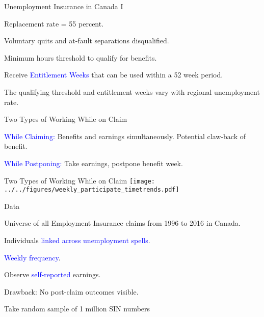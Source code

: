 \documentclass{beamer}
\newenvironment{wideenumerate}{\enumerate\addtolength{\itemsep}{16pt}}{\endenumerate}
\newenvironment{widelist}{\itemize\addtolength{\itemsep}{16pt}}{\enditemize}
\begin{document}
\begin{frame}{Unemployment Insurance in Canada I}
\begin{widelist}
	\item Replacement rate = 55 percent.
	\item Voluntary quits and at-fault separations disqualified.
	\item Minimum hours threshold to qualify for benefits.
	\item Receive \textcolor{blue}{Entitlement Weeks} that can be used within a 52 week period.
	\item The qualifying threshold and entitlement weeks vary with regional unemployment rate.
\end{widelist}
\end{frame}


\begin{frame}{Two Types of Working While on Claim}
\begin{widelist}
	\item \textcolor{blue}{While Claiming:} Benefits and earnings simultaneously. Potential claw-back of benefit.
	\item \textcolor{blue}{While Postponing:} Take earnings, postpone benefit week.
\end{widelist}
\end{frame}

\begin{frame}{Two Types of Working While on Claim}
\texttt{[image: ../../figures/weekly\_participate\_timetrends.pdf]}
\end{frame}

\begin{frame}{Data}
\begin{wideenumerate}
	\item Universe of all Employment Insurance claims from 1996 to 2016 in Canada. \\
	\item Individuals \textcolor{blue}{linked across unemployment spells}.
	\item \textcolor{blue}{Weekly frequency}.
	\item Observe \textcolor{blue}{self-reported} earnings.
	\item Drawback: No post-claim outcomes visible.
	\item Take random sample of 1 million SIN numbers
\end{wideenumerate}
\end{frame}
\end{document}
